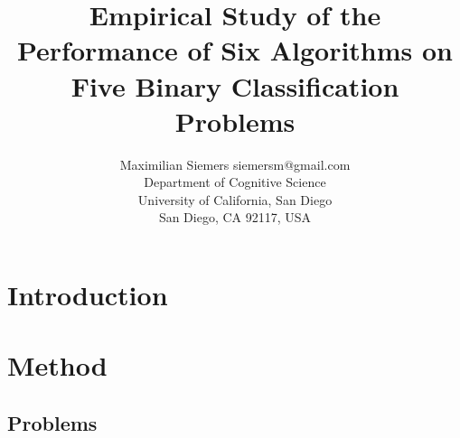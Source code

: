 \documentclass[twoside,11pt]{article}
\begin{document}
	
	\title{Empirical Study of the Performance of Six Algorithms on Five Binary Classification Problems}
	
	\author{\name Maximilian Siemers \email siemersm@gmail.com \\
		\addr Department of Cognitive Science\\
		University of California, San Diego\\
		San Diego, CA 92117, USA}
	
	
	\maketitle
	
	\begin{abstract}%
		
	\end{abstract}
	
	\begin{keywords}
		
	\end{keywords}

	
	\section{Introduction}
	
	\section{Method}
		
		\subsection{Problems}
			\begin{table}[h]
			\end{table}
	
\end{document}
